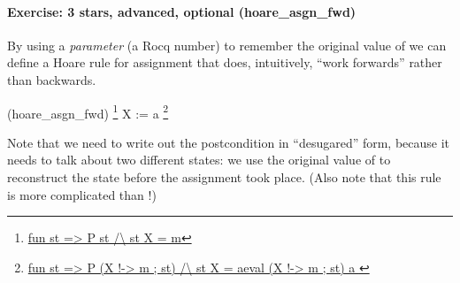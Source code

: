 \documentclass[12pt]{report}
\begin{document}
\paragraph{Exercise: 3 stars, advanced, optional (hoare\_asgn\_fwd)}




    By using a \textit{parameter}  (a Rocq number) to remember the
    original value of  we can define a Hoare rule for assignment
    that does, intuitively, ``work forwards'' rather than backwards.
\par
\noindent\hrulefill\par
\noindent{} (hoare\_asgn\_fwd)
       \footnote{\url{fun st => P st /\ st X = m}}
         X := a
       \footnote{\url{fun st => P (X !-> m ; st) /\ st X = aeval (X !-> m ; st) a }}


    Note that we need to write out the postcondition in ``desugared''
    form, because it needs to talk about two different states: we use
    the original value of  to reconstruct the state  before the
    assignment took place.  (Also note that this rule is more complicated
    than !)
\end{document}

